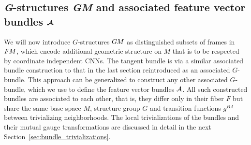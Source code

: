 

\subsection%
    [\textit{G}-structures \textit{GM} and associated feature vector bundles \texorpdfstring{$\A$}{A}]%
    {\textit{G}-structures \textit{GM} and associated feature vector bundles $\boldsymbol{\mathcal{A}}$}
\label{sec:G_associated_bundles}


We will now introduce $G$-structures $G\mkern-1.4muM$ as distinguished subsets of frames in $F\mkern-1.5muM$, which encode additional geometric structure on $M$ that is to be respected by coordinate independent CNNs.
The tangent bundle is via a similar associated bundle construction to that in the last section reintroduced as an associated $G$-bundle.
This approach can be generalized to construct any other associated $G$-bundle, which we use to define the feature vector bundles $\A$.
All such constructed bundles are associated to each other, that is, they differ only in their fiber $F$ but share the same base space $M$, structure group $G$ and transition functions $g^{BA}$ between trivializing neighborhoods.
The local trivializations of the bundles and their mutual gauge transformations are discussed in detail in the next Section~\ref{sec:bundle_trivializations}.






